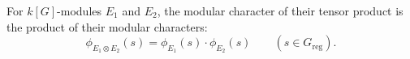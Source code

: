 For $k[G]$-modules $E_1$ and $E_2$, the modular character of their tensor product is the product of their modular characters:
$$\phi_{E_1 \otimes E_2}(s) = \phi_{E_1}(s) \cdot \phi_{E_2}(s) \qquad (s \in G_{\text{reg}}).$$
